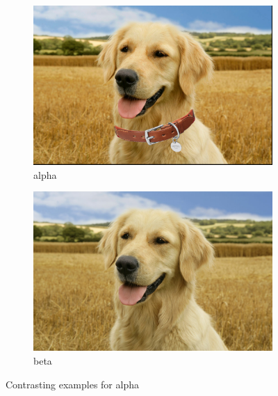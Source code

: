 \begin{figure}
  \begin{subfigure}{0.2\columnwidth}
    \includegraphics[width=\columnwidth]{fig/golden-retriever-collar.jpg}
    \caption{alpha}
  \end{subfigure}
  \begin{subfigure}{0.2\columnwidth}
    \includegraphics[width=\columnwidth]{fig/golden-retriever.jpg}
    \caption{beta}
  \end{subfigure}
  \caption{Contrasting examples for alpha}
\end{figure}

